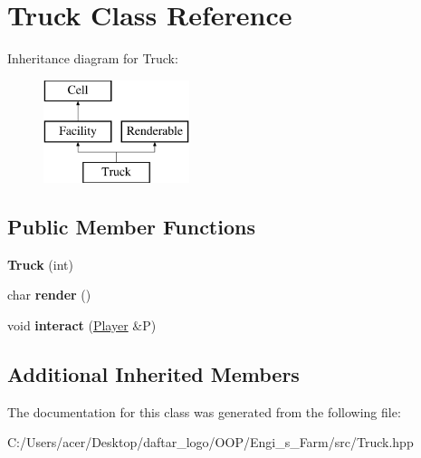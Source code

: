\hypertarget{class_truck}{}\section{Truck Class Reference}
\label{class_truck}
Inheritance diagram for Truck\+:\begin{figure}[H]
\begin{center}
\leavevmode
\includegraphics[height=3.000000cm]{class_truck}
\end{center}
\end{figure}
\subsection*{Public Member Functions}
\begin{DoxyCompactItemize}
\item 
\mbox{\label{class_truck_a43dc6b68b428af2f257f5584c85a95e5}} 
{\bfseries Truck} (int)
\item 
\mbox{\label{class_truck_a47dc2b7e201b85933aea7da631df7f1b}} 
char {\bfseries render} ()
\item 
\mbox{\label{class_truck_a03e1f131eaac6fea1306a2fa0e4707ae}} 
void {\bfseries interact} (\mbox{\hyperlink{class_player}{Player}} \&P)
\end{DoxyCompactItemize}
\subsection*{Additional Inherited Members}


The documentation for this class was generated from the following file\+:\begin{DoxyCompactItemize}
\item 
C\+:/\+Users/acer/\+Desktop/daftar\+\_\+logo/\+O\+O\+P/\+Engi\+\_\+s\+\_\+\+Farm/src/Truck.\+hpp\end{DoxyCompactItemize}
